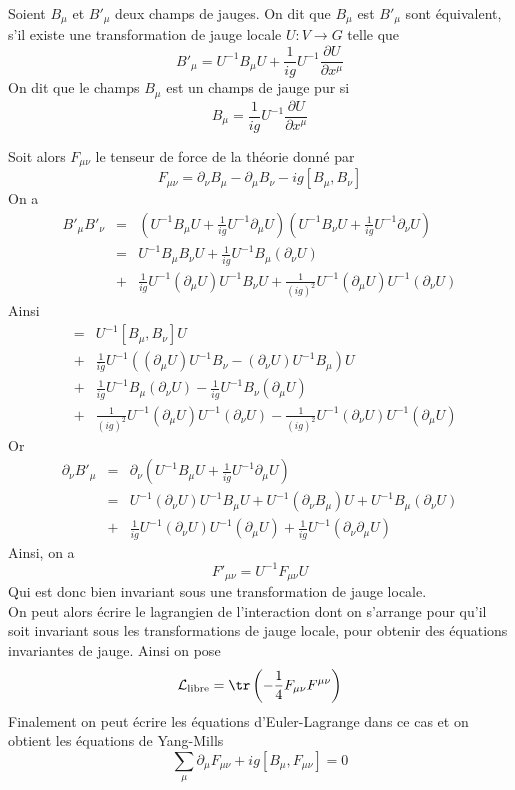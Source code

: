 \begin{defi}
Soient $B_\mu$ et $B'_\mu$ deux champs de jauges. On dit que $B_\mu$ est $B'_\mu$ sont équivalent, s'il existe une transformation de jauge locale $U: V\to G$ telle que 
$$B'_\mu = U^{-1}B_\mu U + \frac{1}{ig}U^{-1}\frac{\partial U}{\partial x^\mu}$$
On dit que le champs $B_\mu$ est un champs de jauge pur si 
$$B_\mu = \frac{1}{ig}U^{-1}\frac{\partial U}{\partial x^\mu}$$
\end{defi}
Soit alors $F_{\mu\nu}$ le tenseur de force de la théorie donné par
$$F_{\mu\nu} = \partial_\nu B_\mu - \partial_\mu B_\nu - ig[B_\mu, B_\nu]$$
On a 
\begin{eqnarray*}
B'_\mu B'_\nu &=& \left(U^{-1}B_\mu U + \frac{1}{ig}U^{-1}\partial_\mu U\right)\left(U^{-1}B_\nu U + \frac{1}{ig}U^{-1}\partial_\nu U\right) \\
&=& U^{-1}B_\mu B_\nu U + \frac{1}{ig}U^{-1}B_\mu (\partial_\nu U) \\
&+& \frac{1}{ig}U^{-1} (\partial_\mu U) U^{-1}B_\nu U + \frac{1}{(ig)^2}U^{-1}(\partial_\mu U) U^{-1} (\partial_\nu U)
\end{eqnarray*}
Ainsi
\begin{eqnarray*}
[B'_\mu, B'_\nu] &=& U^{-1}[B_\mu, B_\nu]U \\
&+& \frac{1}{ig}U^{-1}\left( (\partial_\mu U)U^{-1}B_\nu - (\partial_\nu U)U^{-1}B_\mu \right) U \\ 
&+& \frac{1}{ig}U^{-1} B_\mu (\partial_\nu U) - \frac{1}{ig}U^{-1} B_\nu (\partial_\mu U) \\
&+& \frac{1}{(ig)^2}U^{-1}(\partial_\mu U) U^{-1} (\partial_\nu U) - \frac{1}{(ig)^2}U^{-1}(\partial_\nu U) U^{-1} (\partial_\mu U)
\end{eqnarray*}
Or 
\begin{eqnarray*}
\partial_\nu B'_\mu &=& \partial_\nu \left(U^{-1}B_\mu U + \frac{1}{ig}U^{-1}\partial_\mu U\right) \\
&=& U^{-1} (\partial_\nu U) U^{-1} B_\mu U + U^{-1} (\partial_\nu B_\mu)U + U^{-1}B_\mu (\partial_\nu U) \\
&+& \frac{1}{ig}U^{-1}(\partial_\nu U)U^{-1}(\partial_\mu U) + \frac{1}{ig} U^{-1} (\partial_\nu \partial_\mu U)
\end{eqnarray*}
Ainsi, on a
$$F'_{\mu\nu} = U^{-1} F_{\mu\nu} U$$
Qui est donc bien invariant sous une transformation de jauge locale. \\

On peut alors écrire le lagrangien de l'interaction dont on s'arrange pour qu'il soit invariant sous les transformations de jauge locale, pour obtenir des équations invariantes de jauge. Ainsi on pose
$$\mathcal{L}_{\text{libre}} = \tr \left(-\frac{1}{4}F_{\mu\nu}F^{\mu\nu}\right)$$
Finalement on peut écrire les équations d'Euler-Lagrange dans ce cas et on obtient les équations de Yang-Mills
$$\sum_\mu \partial_\mu F_{\mu\nu} + ig[B_\mu, F_{\mu\nu}] = 0$$

